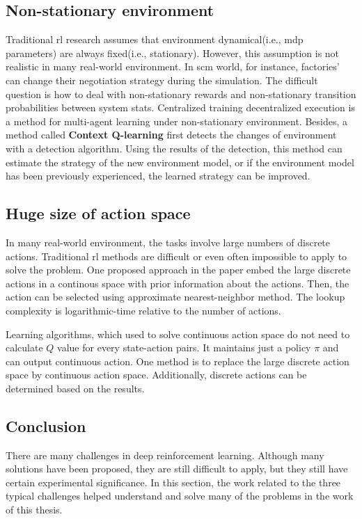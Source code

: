 \subsection{Non-stationary environment}
Traditional \gls{rl} research assumes that environment dynamical(i.e., \gls{mdp} parameters) are always fixed(i.e., stationary). However, this assumption is not realistic in many real-world environment. In \gls{scm} world, for instance, factories' can change their negotiation strategy during the simulation. The difficult question is how to deal with non-stationary rewards and non-stationary transition probabilities between system stats. Centralized training decentralized execution\parencite{maddpg2017} is a method for multi-agent learning under non-stationary environment. Besides, a method called \textbf{Context Q-learning}\parencite{Padakandla_2020} first detects the changes of environment with a detection algorithm. Using the results of the detection, this method can estimate the strategy of the new environment model, or if the environment model has been previously experienced, the learned strategy can be improved.

\subsection{Huge size of action space}
In many real-world environment, the tasks involve large numbers of discrete actions. Traditional \gls{rl} methods are difficult or even often impossible to apply to solve the problem. One proposed approach in the paper \parencite{dulacarnold2016deep} embed the large discrete actions in a continous space with prior information about the actions. Then, the action can be selected using approximate nearest-neighbor method. The lookup complexity is logarithmic-time relative to the number of actions.

Learning algorithms, which used to solve continuous action space do not need to calculate $Q$ value for every state-action pairs. It maintains just a policy $\pi$ and can output continuous action. One method is to replace the large discrete action space by continuous action space. Additionally, discrete actions can be determined based on the results.

\subsection{Conclusion}
There are many challenges in deep reinforcement learning. Although many solutions have been proposed, they are still difficult to apply, but they still have certain experimental significance. In this section, the work related to the three typical challenges helped understand and solve many of the problems in the work of this thesis.